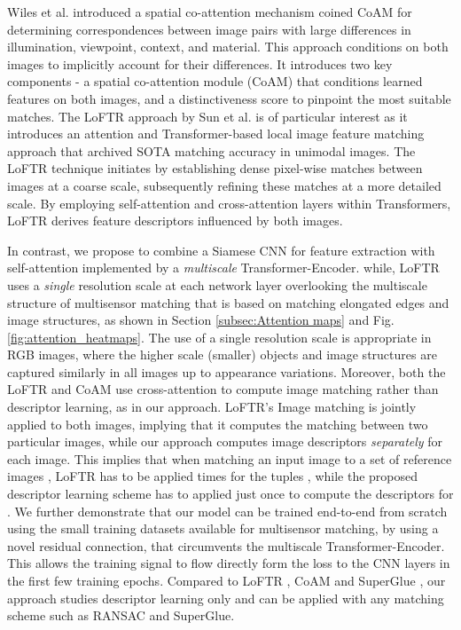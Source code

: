 \documentclass[10pt,journal]{IEEEtran}\usepackage{amsfonts}
\begin{document}
Wiles et al. introduced a spatial co-attention mechanism coined CoAM \cite {CoAM} for determining correspondences between image pairs with large
differences in illumination, viewpoint, context, and material. This approach
conditions on both images to implicitly account for their differences. It
introduces two key components - a spatial co-attention module (CoAM) that
conditions learned features on both images, and a distinctiveness score to
pinpoint the most suitable matches. The LoFTR approach \cite{LoFTR} by Sun
et al. is of particular interest as it introduces an attention and
Transformer-based local image feature matching approach that archived SOTA
matching accuracy in unimodal images. The LoFTR technique initiates by
establishing dense pixel-wise matches between images at a coarse scale,
subsequently refining these matches at a more detailed scale. By employing
self-attention and cross-attention layers within Transformers, LoFTR derives
feature descriptors influenced by both images.

In contrast, we propose to combine a Siamese CNN for feature extraction with
self-attention implemented by a \textit{multiscale} Transformer-Encoder.
while, LoFTR uses a \textit{single} resolution scale at each network layer
overlooking the multiscale structure of multisensor matching that is based
on matching elongated edges and image structures, as shown in Section \ref {subsec:Attention maps} and Fig. \ref{fig:attention_heatmaps}. The use of a
single resolution scale is appropriate in RGB images, where the higher scale
(smaller) objects and image structures are captured similarly in all images
up to appearance variations. Moreover, both the LoFTR \cite{LoFTR} and CoAM
\cite{CoAM} use cross-attention to compute image matching rather than
descriptor learning, as in our approach. LoFTR's Image matching is jointly
applied to both images, implying that it computes the matching between two
particular images, while our approach computes image descriptors \textit{separately} for each image. This implies that when matching an input image  to a set of  reference images , LoFTR has to be applied  times for the tuples , while the proposed descriptor learning scheme
has to applied just once to compute the descriptors for . We
further demonstrate that our model can be trained end-to-end from scratch
using the small training datasets available for multisensor matching, by
using a novel residual connection, that circumvents the multiscale
Transformer-Encoder. This allows the training signal to flow directly form
the loss to the CNN layers in the first few training epochs. Compared to
LoFTR \cite{LoFTR}, CoAM \cite{CoAM} and SuperGlue \cite{SuperGlue}, our
approach studies descriptor learning only and can be applied with any
matching scheme such as RANSAC \cite{RANSAC} and SuperGlue.
\end{document}
